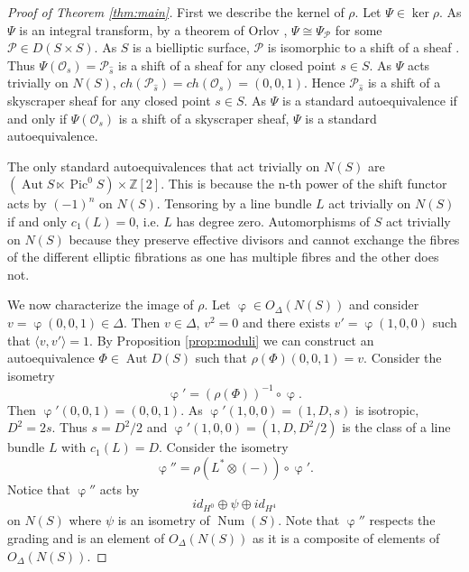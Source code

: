 \documentclass[a4paper, 12pt, twoside]{amsart}
\theoremstyle{plain}
\theoremstyle{definition}
\DeclareMathOperator{\iso}{\cong}
\DeclareMathOperator{\Pic}{Pic}
\DeclareMathOperator{\num}{Num}
\DeclareMathOperator{\Aut}{Aut}
\DeclareMathOperator{\vp}{\varphi}
\begin{document}
\begin{proof}[Proof of Theorem \ref{thm:main}]
  First we describe the kernel of $\rho$. Let $\Psi \in \ker \rho$.
  As $\Psi$ is an integral transform, by a theorem of Orlov
  \cite[Theorem 5.14]{MR2244106}, $\Psi \iso \Psi_{\mathcal{P}}$ for
  some $\mathcal{P} \in D(S \times S)$.  As $S$ is a bielliptic
  surface, $\mathcal{P}$ is isomorphic to a shift of a sheaf
  \cite[Proposition 5.1]{MR3148638}. Thus
  $\Psi(\mathcal{O}_s) = \mathcal{P}_{\hat{s}}$ is a shift of a sheaf
  for any closed point $s \in S$. As $\Psi$ acts trivially on $N(S)$,
  $ch(\mathcal{P}_{\hat{s}}) = ch(\mathcal{O}_s) = (0,0,1)$.  Hence
  $\mathcal{P}_{\hat{s}}$ is a shift of a skyscraper sheaf for any
  closed point $s\in S$.  As $\Psi$ is a standard autoequivalence if
  and only if $\Psi(\mathcal{O}_s)$ is a shift of a skyscraper sheaf,
  $\Psi$ is a standard autoequivalence.

  The only standard autoequivalences that act trivially on $N(S)$ are
  $(\Aut S \ltimes \Pic^0 S) \times \mathbb{Z}[2]$. This is because
  the n-th power of the shift functor acts by $(-1)^n$ on
  $N(S)$. Tensoring by a line bundle $L$ act trivially on $N(S)$ if
  and only $c_1(L) = 0$, i.e. $L$ has degree zero. Automorphisms of
  $S$ act trivially on $N(S)$ because they preserve effective divisors
  and cannot exchange the fibres of the different elliptic fibrations
  as one has multiple fibres and the other does not.  \newline

  We now characterize the image of $\rho$. Let
  $\vp \in O_{\Delta}(N(S))$ and consider $v = \vp(0,0,1) \in
  \Delta$. Then $v \in \Delta$, $v^2 = 0$ and there exists
  $v' = \vp(1,0,0)$ such that $\langle v,v' \rangle = 1$. By
  Proposition \ref{prop:moduli} we can construct an autoequivalence
  $\Phi \in \Aut D(S)$ such that $\rho(\Phi)(0,0,1) = v$. Consider the
  isometry
  \[ 
    \vp' = (\rho(\Phi))^{-1} \circ \vp.
 \] 
 Then $\vp'(0,0,1) = (0,0,1)$. As $\vp'(1,0,0) = (1,D,s)$ is
 isotropic, $D^2 = 2s$. Thus $s = D^2/2$ and
 $\vp'(1,0,0) = (1,D,D^2/2)$ is the class of a line bundle $L$ with
 $c_1(L) =D$. Consider the isometry
\[
  \vp'' = \rho(L^* \otimes (-)) \circ \vp'.
\]
Notice that $\vp''$ acts by
\[ id_{H^0} \oplus \psi \oplus id_{H^4} \] on $N(S)$ where $\psi$ is
an isometry of $\num(S)$. Note that $\vp''$ respects the grading and
is an element of $O_{\Delta}(N(S))$ as it is a composite of elements
of $O_{\Delta}(N(S))$.  \newline


\end{proof}
\end{document}
